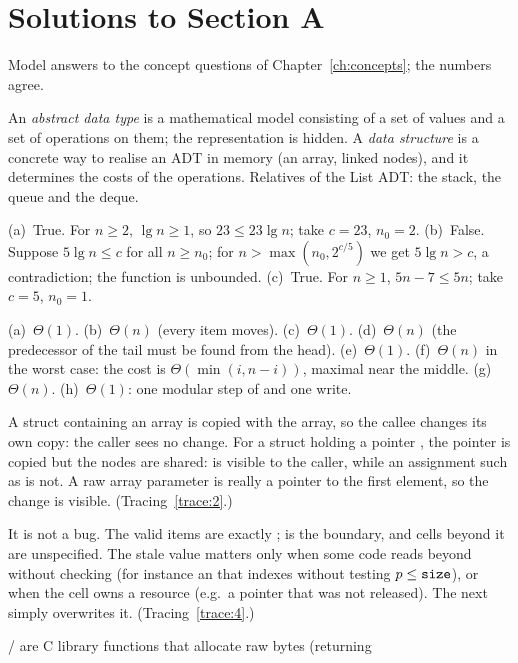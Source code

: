 \chapter{Solutions to Section A}\label{ch:solconcepts}

Model answers to the concept questions of Chapter~\ref{ch:concepts}; the numbers agree.

\begin{questions}
\item An \emph{abstract data type} is a mathematical model consisting of a set of values
  and a set of operations on them; the representation is hidden. A \emph{data structure}
  is a concrete way to realise an ADT in memory (an array, linked nodes), and it
  determines the costs of the operations. Relatives of the List ADT: the stack, the queue
  and the deque.
\item (a)~True. For $n\ge2$, $\lg n\ge1$, so $23\le23\lg n$; take $c=23$, $n_0=2$.
  (b)~False. Suppose $5\lg n\le c$ for all $n\ge n_0$; for $n>\max(n_0,2^{c/5})$ we get
  $5\lg n>c$, a contradiction; the function is unbounded. (c)~True. For $n\ge1$,
  $5n-7\le5n$; take $c=5$, $n_0=1$.
\item (a)~$\Theta(1)$. (b)~$\Theta(n)$ (every item moves). (c)~$\Theta(1)$.
  (d)~$\Theta(n)$ (the predecessor of the tail must be found from the head).
  (e)~$\Theta(1)$. (f)~$\Theta(n)$ in the worst case: the cost is
  $\Theta(\min(i,n-i))$, maximal near the middle. (g)~$\Theta(n)$. (h)~$\Theta(1)$:
  one modular step of  and one write.
\item A struct containing an array is copied with the array, so the callee changes its own
  copy: the caller sees no change. For a struct holding a pointer , the pointer
  is copied but the nodes are shared:  is visible to the caller,
  while an assignment such as  is not. A raw array parameter 
  is really a pointer to the first element, so the change is visible.
  (Tracing~\ref{trace:2}.)
\item It is not a bug. The valid items are exactly ;  is
  the boundary, and cells beyond it are unspecified. The stale value matters only when
  some code reads beyond  without checking (for instance an  that
  indexes without testing $p\le\texttt{size}$), or when the cell owns a resource (e.g.\ a
  pointer that was not released). The next  simply overwrites it.
  (Tracing~\ref{trace:4}.)
\item {}/ are C library functions that allocate raw bytes (returning

\end{questions}
